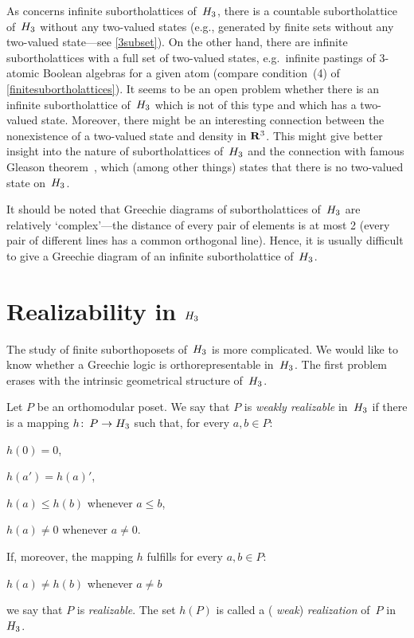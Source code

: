 As concerns infinite subortholattices of~$H_3$, there is a countable
subortholattice of~$H_3$ without any two-valued states (e.g., generated by
finite sets without any two-valued state---see \ref{3subset}). On the other
hand, there are infinite subortholattices with a full set of two-valued
states, e.g.\ infinite pastings of 3-atomic Boolean algebras for a given atom
(compare condition~(4) of \ref{finitesubortholattices}). It seems to be an
open problem whether there is an infinite subortholattice of~$H_3$ which is
not of this type and which has a two-valued state. Moreover, there might be
an interesting connection between the nonexistence of a two-valued state and
density in ${\bf R}^3$. This might give better insight into the nature of
subortholattices of~$H_3$ and the connection with famous Gleason
theorem~\cite{Gleason,Ptak-Pulmannova}, which (among other things) states
that there is no two-valued state on~$H_3$.

It should be noted that Greechie diagrams of subortholattices of~$H_3$ are
relatively `complex'---the distance of every pair of elements is at most 2
(every pair of different lines has a common orthogonal line). Hence, it is
usually difficult to give a Greechie diagram of an infinite subortholattice
of~$H_3$.




\section {Realizability in $H_3$}


The study of finite suborthoposets of~$H_3$ is more complicated. We would
like to know whether a Greechie logic is orthorepresentable in~$H_3$. The
first problem erases with the intrinsic geometrical structure of~$H_3$.


\begin {definition}
Let $P$ be an orthomodular poset. We say that $P$ is {\em weakly
realizable\/} in~$H_3$ if there is a mapping $h\colon\, P \to H_3$ such
that, for every $a,b \in P$:
  \begin {conditions}
  \item $h(0)=0$,
  \item $h(a')=h(a)'$,
  \item $h(a) \le h(b)$ whenever $a \le b$,
  \item $h(a) \neq 0$ whenever $a \neq 0$.
  \end {conditions}
If, moreover, the mapping $h$ fulfills for every $a,b \in P$:
  \begin {conditions}
  \item [(4')] $h(a) \neq h(b)$ whenever $a \neq b$
  \end {conditions}
we say that $P$ is {\em realizable}. The set $h(P)$ is called a ({\em
weak\/}) {\em realization\/} of~$P$ in~$H_3$.
\end {definition}

